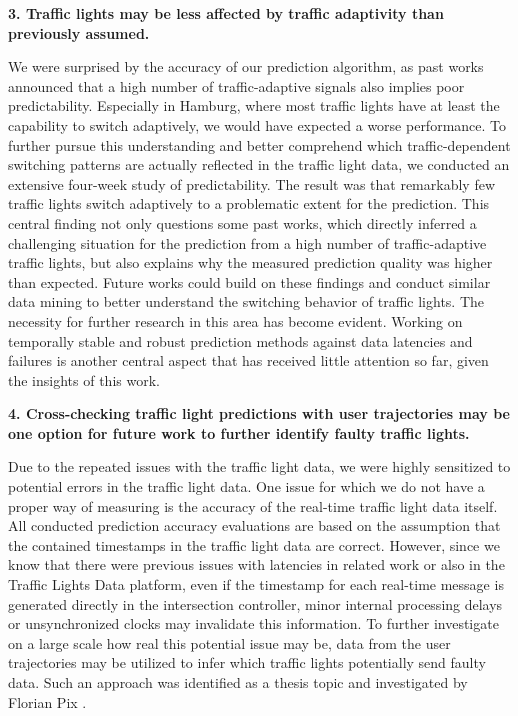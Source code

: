 \textbf{\color{cidarkblue}3. Traffic lights may be less affected by traffic adaptivity than previously assumed.} 

We were surprised by the accuracy of our prediction algorithm, as past works announced that a high number of traffic-adaptive signals also implies poor predictability. Especially in Hamburg, where most traffic lights have at least the capability to switch adaptively, we would have expected a worse performance. To further pursue this understanding and better comprehend which traffic-dependent switching patterns are actually reflected in the traffic light data, we conducted an extensive four-week study of predictability. The result was that remarkably few traffic lights switch adaptively to a problematic extent for the prediction. This central finding not only questions some past works, which directly inferred a challenging situation for the prediction from a high number of traffic-adaptive traffic lights, but also explains why the measured prediction quality was higher than expected. Future works could build on these findings and conduct similar data mining to better understand the switching behavior of traffic lights. The necessity for further research in this area has become evident. Working on temporally stable and robust prediction methods against data latencies and failures is another central aspect that has received little attention so far, given the insights of this work.

\textbf{\color{cidarkblue}4. Cross-checking traffic light predictions with user trajectories may be one option for future work to further identify faulty traffic lights.} 

Due to the repeated issues with the traffic light data, we were highly sensitized to potential errors in the traffic light data. One issue for which we do not have a proper way of measuring is the accuracy of the real-time traffic light data itself. All conducted prediction accuracy evaluations are based on the assumption that the contained timestamps in the traffic light data are correct. However, since we know that there were previous issues with latencies in related work or also in the Traffic Lights Data platform, even if the timestamp for each real-time message is generated directly in the intersection controller, minor internal processing delays or unsynchronized clocks may invalidate this information. To further investigate on a large scale how real this potential issue may be, data from the user trajectories may be utilized to infer which traffic lights potentially send faulty data. Such an approach was identified as a thesis topic and investigated by Florian Pix \cite{pix_2024}.

